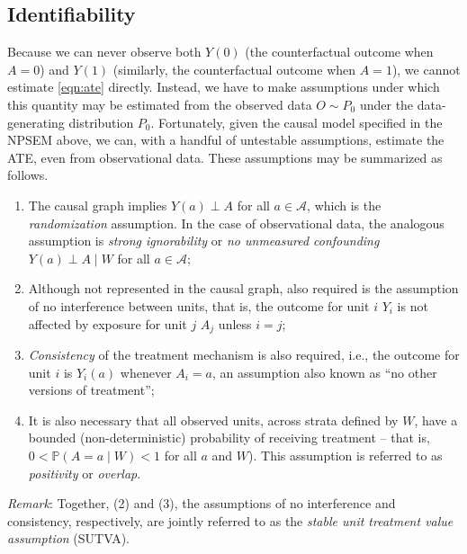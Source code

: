 \documentclass[
  12pt, krantz2,
]{book}
\providecommand{\tightlist}{%
  \setlength{\itemsep}{0pt}\setlength{\parskip}{0pt}}
\theoremstyle{definition}
\theoremstyle{definition}
\theoremstyle{definition}
\newcommand{\1}{\mathbbm{1}}
\begin{document}
\hypertarget{identifiability}{%
\subsection*{Identifiability}\label{identifiability}}


Because we can never observe both \(Y(0)\) (the counterfactual outcome when \(A=0\))
and \(Y(1)\) (similarly, the counterfactual outcome when \(A=1\)), we cannot
estimate \ref{eqn:ate} directly. Instead, we have to make assumptions under
which this quantity may be estimated from the observed data \(O \sim P_0\) under
the data-generating distribution \(P_0\). Fortunately, given the causal model
specified in the NPSEM above, we can, with a handful of untestable assumptions,
estimate the ATE, even from observational data. These assumptions may be
summarized as follows.

\begin{enumerate}
\def\labelenumi{\arabic{enumi}.}
\tightlist
\item
  The causal graph implies \(Y(a) \perp A\) for all \(a \in \mathcal{A}\), which
  is the \emph{randomization} assumption. In the case of observational data, the
  analogous assumption is \emph{strong ignorability} or \emph{no unmeasured confounding}
  \(Y(a) \perp A \mid W\) for all \(a \in \mathcal{A}\);
\item
  Although not represented in the causal graph, also required is the assumption
  of no interference between units, that is, the outcome for unit \(i\) \(Y_i\) is
  not affected by exposure for unit \(j\) \(A_j\) unless \(i=j\);
\item
  \emph{Consistency} of the treatment mechanism is also required, i.e., the outcome
  for unit \(i\) is \(Y_i(a)\) whenever \(A_i = a\), an assumption also known as ``no
  other versions of treatment'';
\item
  It is also necessary that all observed units, across strata defined by \(W\),
  have a bounded (non-deterministic) probability of receiving treatment --
  that is, \(0 < \mathbb{P}(A = a \mid W) < 1\) for all \(a\) and \(W\)). This assumption
  is referred to as \emph{positivity} or \emph{overlap}.
\end{enumerate}

\emph{Remark}: Together, (2) and (3), the assumptions of no interference and
consistency, respectively, are jointly referred to as the \emph{stable unit
treatment value assumption} (SUTVA).
\end{document}

